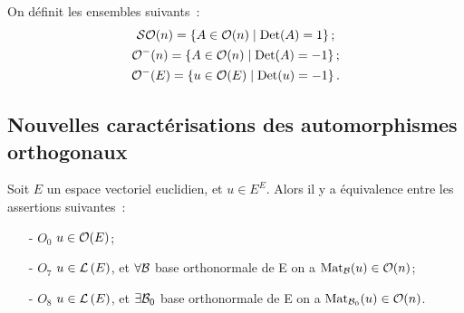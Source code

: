 \begin{defdef}
  On définit les ensembles suivants~:
  \begin{gather}
     \SOrth{n}   = \enstq{A \in \Orth{n}}{\Det(A)=1}; \\
     \Orthmin{n} = \enstq{A \in \Orth{n}}{\Det(A)=-1}; \\
     \Orthmin{E} = \enstq{u \in \Orth{E}}{\Det(u)=-1}.
   \end{gather}
 \end{defdef}

\subsection{Nouvelles caractérisations des automorphismes orthogonaux}

\begin{theo}
  Soit $E$ un espace vectoriel euclidien, et $u \in E^E$. Alors il y a équivalence entre les assertions suivantes~:
  \begin{itemize}
  \item[- $O_0$] $u \in \Orth{E}$;
  \item[- $O_7$] $u \in \Endo{E}$, et $\forall \B$ base orthonormale de E on a $\Mat_\B(u) \in \Orth{n}$;
  \item[- $O_8$] $u \in \Endo{E}$, et $\exists \B_0$ base orthonormale de E on a $\Mat_{\B_0}(u) \in \Orth{n}$.
  \end{itemize}
\end{theo}
